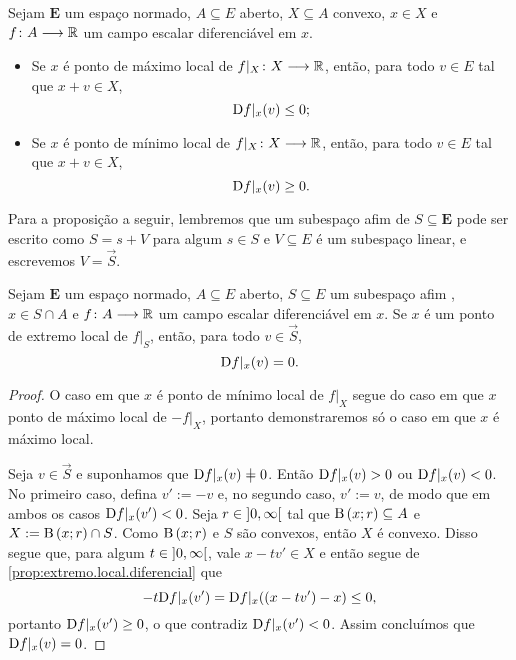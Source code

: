 \begin{proposition}
\label{prop:extremo.local.diferencial.alternativa}
Sejam $\bm E$ um espaço normado, $A \subseteq E$ aberto, $X \subseteq A$ convexo, $x \in X$ e $f\colon \allowbreak A \longrightarrow \mathbb{R}$ um campo escalar diferenciável em $x$.
	\begin{itemize}
		\item Se $x$ é ponto de máximo local de $f|_X\colon \allowbreak X \longrightarrow \mathbb{R}$, então, para todo $v \in E$ tal que $x+v \in X$,
			\begin{equation*}
			\mathrm{D} f|_x(v) \leq 0;
			\end{equation*}
		\item Se $x$ é ponto de mínimo local de $f|_X\colon \allowbreak X \longrightarrow \mathbb{R}$, então, para todo $v \in E$ tal que $x+v \in X$,
			\begin{equation*}
			\mathrm{D} f|_x(v) \geq 0.
			\end{equation*}
	\end{itemize}
\end{proposition}

Para a proposição a seguir, lembremos que um subespaço afim de $S \subseteq \bm E$ pode ser escrito como $S = s+V$ para algum $s \in S$ e $V \subseteq E$ é um subespaço linear, e escrevemos $V = \vec{S}$.

\begin{proposition}
\label{prop:extremo.afim.critico}
Sejam $\bm E$ um espaço normado, $A \subseteq E$ aberto, $S \subseteq E$ um subespaço afim%
, $x \in S \cap A$ e $f\colon \allowbreak A \longrightarrow \mathbb{R}$ um campo escalar diferenciável em $x$. Se $x$ é um ponto de extremo local de $f|_S$, então, para todo $v \in \vec{S}$,
	\begin{equation*}
	\mathrm{D} f|_x(v) = 0.
	\end{equation*}
\end{proposition}
\begin{proof}
O caso em que $x$ é ponto de mínimo local de $f|_X$ segue do caso em que $x$ ponto de máximo local de $-f|_X$, portanto demonstraremos só o caso em que $x$ é máximo local.

Seja $v \in \vec{S}$ e suponhamos que $\D f|_x(v) \neq 0$. Então $\mathrm{D} f|_x(v) > 0$ ou $\mathrm{D} f|_x(v) < 0$. No primeiro caso, defina $v':=-v$ e, no segundo caso, $v':=v$, de modo que em ambos os casos $\mathrm{D} f|_x(v') < 0$. Seja $r \in \left]0,\allowbreak \infty\right[$ tal que $\mathrm{B}\left(x; r\right) \subseteq A$ e $X := \mathrm{B}\left(x; r\right) \cap S$. Como $\mathrm{B}\left(x; r\right)$ e $S$ são convexos, então $X$ é convexo. Disso segue que, para algum $t \in \left]0,\allowbreak \infty\right[$, vale $x-tv' \in X$ e então segue de \ref{prop:extremo.local.diferencial} que
	\begin{equation*}
	-t\mathrm{D} f|_x(v') = \mathrm{D} f|_x((x-tv') - x) \leq 0,
	\end{equation*}
portanto $\mathrm{D} f|_x(v') \geq 0$, o que contradiz $\mathrm{D} f|_x(v') < 0$. Assim concluímos que $\mathrm{D} f|_x (v) = 0$.
\end{proof}

